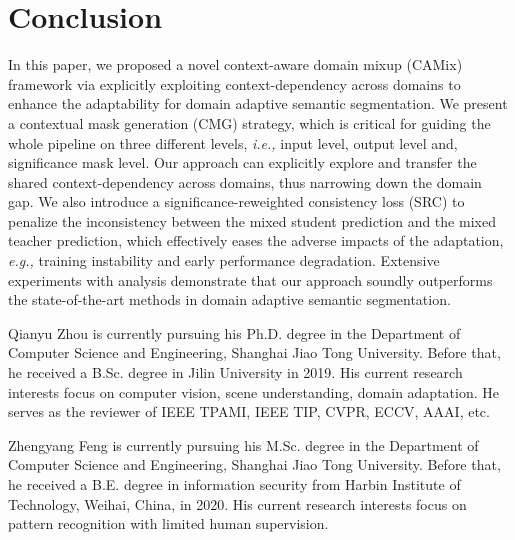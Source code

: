 \documentclass[journal]{IEEEtran}
\begin{document}
{\begin{minipage}{\textwidth}
\section{Conclusion}
In this paper, we proposed a novel context-aware domain mixup (CAMix) framework via explicitly exploiting context-dependency across domains to enhance the adaptability for domain adaptive semantic segmentation. We present a contextual mask generation (CMG) strategy, which is critical for guiding the whole pipeline on three different levels, \emph{i.e.,} input level, output level and, significance mask level. Our approach can explicitly explore and transfer the shared context-dependency across domains, thus narrowing down the domain gap. We also introduce a significance-reweighted consistency loss (SRC) to penalize the inconsistency between the mixed student prediction and the mixed teacher prediction, which effectively eases the adverse impacts of the adaptation, \emph{e.g.,} training instability and early performance degradation. Extensive experiments with analysis 
demonstrate that our approach soundly outperforms the state-of-the-art methods in domain adaptive semantic segmentation.







\ifCLASSOPTIONcaptionsoff
  \newpage
\fi










\vspace{-1cm}
\begin{IEEEbiography}{Qianyu Zhou} is currently pursuing his Ph.D. degree in the Department of Computer Science and Engineering, Shanghai Jiao Tong University. Before that, he received a B.Sc. degree in Jilin University in 2019. His current research interests focus on computer vision, scene understanding, domain adaptation. He serves as the reviewer of IEEE TPAMI, IEEE TIP, CVPR, ECCV, AAAI, etc.
\end{IEEEbiography}

\vspace{-1.5cm}

\begin{IEEEbiography}{Zhengyang Feng}
is currently pursuing his M.Sc. degree in the Department of Computer Science and Engineering, Shanghai Jiao Tong University. Before that, he received a B.E. degree in information security from Harbin Institute of Technology, Weihai, China, in 2020. His current research interests focus on pattern recognition with limited human supervision.
\end{IEEEbiography}


\end{minipage}}
\end{document}
